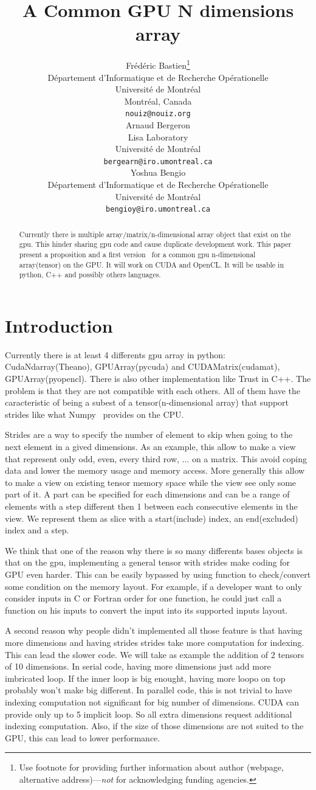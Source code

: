 \documentclass{article} %
\title{A Common GPU N dimensions array}
\author{
Frédéric Bastien\thanks{ Use footnote for providing further information
about author (webpage, alternative address)---\emph{not} for acknowledging
funding agencies.} \\
D\'epartement d'Informatique et de Recherche Op\'erationelle\\
Universit\'e de Montr\'eal\\
Montr\'eal, Canada \\
\texttt{nouiz@nouiz.org} \\
\And
Arnaud Bergeron \\
Lisa Laboratory \\
Universit\'e de Montr\'eal \\
\texttt{bergearn@iro.umontreal.ca} \\
\AND
Yoshua Bengio \\
D\'epartement d'Informatique et de Recherche Op\'erationelle \\
Universit\'e de Montr\'eal \\
\texttt{bengioy@iro.umontreal.ca} \\
}
\begin{document}
\maketitle

\begin{abstract}
Currently there is multiple array/matrix/n-dimensional array object
that exist on the gpu.  This hinder sharing gpu code and cause
duplicate development work. This paper present a proposition and a
first version~\citep{GpuNdArray} for a common gpu n-dimensional
array(tensor) on the GPU. It will work on CUDA and OpenCL. It will be
usable in python, C++ and possibly others languages.
\end{abstract}

\section{Introduction}
Currently there is at least 4 differents gpu array in python:
CudaNdarray(Theano), GPUArray(pycuda) and CUDAMatrix(cudamat),
GPUArray(pyopencl). There is also other implementation like Trust in
C++.  The problem is that they are not compatible with each
others. All of them have the caracteristic of being a subest of a
tensor(n-dimensional array) that support strides like what
Numpy~\citep{numpy-2007} provides on the CPU.

Strides are a way to specify the number of element to skip when going
to the next element in a gived dimensions.  As an example, this allow
to make a view that represent only odd, even, every third row, ... on
a matrix. This avoid coping data and lower the memory usage and memory
access. More generally this allow to make a view on existing tensor
memory space while the view see only some part of it. A part can be
specified for each dimensions and can be a range of elements with a
step different then 1 between each consecutive elements in the
view. We represent them as slice with a start(include) index, an
end(excluded) index and a step.


We think that one of the reason why there is so many differents bases
objects is that on the gpu, implementing a general tensor with strides
make coding for GPU even harder. This can be easily bypassed by using
function to check/convert some condition on the memory layout. For
example, if a developer want to only consider inputs in C or Fortran
order for one function, he could just call a function on his inputs to
convert the input into its supported inputs layout.

A second reason why people didn't implemented all those feature is
that having more dimensions and having strides strides take more
computation for indexing. This can lead the slower code. We will take
as example the addition of 2 tensors of 10 dimensions. In serial code,
having more dimensions just add more imbricated loop. If the inner
loop is big enought, having more loopo on top probably won't make big
different. In parallel code, this is not trivial to have indexing
computation not significant for big number of dimensions. CUDA can
provide only up to 5 implicit loop. So all extra dimensions request
additional indexing computation. Also, if the size of those dimensions
are not suited to the GPU, this can lead to lower performance.
\end{document}
